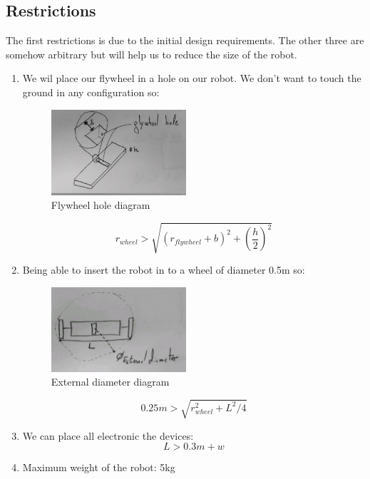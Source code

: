 \subsection{Restrictions}
The first restrictions is due to the initial design requirements. The other three are somehow arbitrary but will help us to reduce the size of the robot.
\begin{enumerate}
\item We wil place our flywheel in a hole on our robot. We don't want to touch the ground in any configuration so:
\begin{figure}[ht]
	\centering
	\includegraphics[width=5cm]{img/flywheel_hole.jpg}
	\caption{Flywheel hole diagram}
	\label{fig:Flywheel hole diagram}
\end{figure}
\[r_{wheel}> \sqrt{(r_{flywheel} + b)^2+(\frac{h}{2})^2}\]
\item Being able  to insert the robot in to a wheel of diameter 0.5m so:
\begin{figure}[ht]
	\centering
	\includegraphics[width=5cm]{img/external_diameter.jpg}
	\caption{External diameter diagram}
	\label{fig:External diameter diagram}
\end{figure}
\[0.25 m > \sqrt{r_{wheel}^2 + L^2/4}\]
\item We can place all electronic the devices:
\[L > 0.3m + w \]
\item Maximum weight of the robot: 5kg
\end{enumerate}

